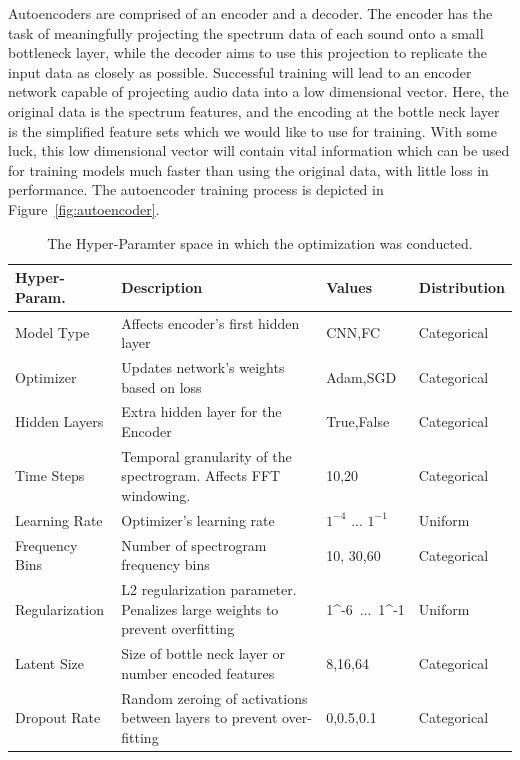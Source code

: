 \documentclass[\main/thesis.tex]{subfiles}
\begin{document}
Autoencoders are comprised of an encoder and a decoder. The encoder has the task of meaningfully projecting the spectrum data of each sound onto a small bottleneck layer, while the decoder aims to use this projection to replicate the input data as closely as possible. Successful training will lead to an encoder network capable of projecting audio data into a low dimensional vector. Here, the original data is the spectrum features, and the encoding at the bottle neck layer is the simplified feature sets which we would like to use for training. With some luck, this low dimensional vector will contain vital information which can be used for training models much faster than using the original data, with little loss in performance. The autoencoder training process is depicted in Figure~\ref{fig:autoencoder}.
\begin{table}[h!]

\begin{tabular}{|p{28mm}|p{50mm}|p{21mm}|p{21mm}|}
\hline
Hyper-Param. & Description  & Values & Distribution\\ \hline
Model Type      &   Affects encoder's first hidden layer & CNN,FC & Categorical \\  \hline
Optimizer       & Updates network's weights based on loss & Adam,SGD & Categorical  \\  \hline
Hidden Layers   & Extra hidden layer for the Encoder & True,False & Categorical \\  \hline
Time Steps & Temporal granularity of the spectrogram. Affects FFT windowing. & 10,20 & Categorical  \\ \hline
Learning Rate   &    Optimizer's learning rate  & $1^{-4}$ ... $1^{-1}$ & Uniform      \\ \hline
Frequency Bins & Number of spectrogram frequency bins & 10, 30,60 & Categorical \\ \hline

Regularization  &  L2 regularization parameter. Penalizes large weights to prevent overfitting & 1^{-6}~...~1^{-1} & Uniform\\ \hline
Latent Size & Size of bottle neck layer or number encoded features & 8,16,64 & Categorical              \\ \hline
Dropout Rate & Random zeroing of activations between layers to prevent over-fitting & 0,0.5,0.1 & Categorical\\  \hline
\end{tabular}
\caption{The Hyper-Paramter space in which the optimization was conducted.}
\label{table:hyper_params}
\end{table}
\end{document}
